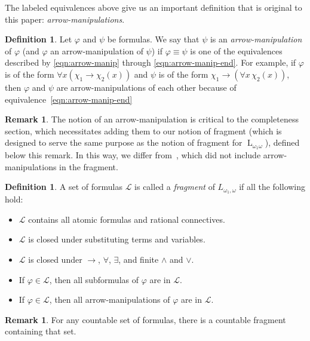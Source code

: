 \documentclass{amsart}
\theoremstyle{definition}
\newtheorem{remark}[theorem]{Remark}
\newtheorem{definition}[theorem]{Definition}
\numberwithin{equation}{theorem}
\renewcommand{\phi}{\varphi}
\newcommand{\narrow}[1]{\xrightarrow{#1}}
\renewcommand{\to}{\narrow{}}
\newcommand{\baselang}{\operatorname{L}}
\newcommand{\lang}{\baselang_{\omega_1\omega}}
\begin{document}
The labeled equivalences above give us an important definition that is original to this paper: \emph{arrow-manipulations}.
\begin{definition}\label{def:arrow-manipulation}
  Let $\phi$ and $\psi$ be formulas.
  We say that $\psi$ is an \emph{arrow-manipulation} of $\phi$ (and $\phi$ an arrow-manipulation of $\psi$) if $\phi\equiv\psi$ is one of the equivalences described by \eqref{eqn:arrow-manip} through \eqref{eqn:arrow-manip-end}.
  For example, if $\phi$ is of the form $\forall x(\chi_1\to\chi_2(x))$ and $\psi$ is of the form $\chi_1\to(\forall x\,\chi_2(x))$, then $\phi$ and $\psi$ are arrow-manipulations of each other because of equivalence~\eqref{eqn:arrow-manip-end}
\end{definition}
\begin{remark}
  The notion of an arrow-manipulation is critical to the completeness section, which necessitates adding them to our notion of fragment (which is designed to serve the same purpose as the notion of fragment for $\lang$), defined below this remark.
  In this way, we differ from~\cite{eagle2014omitting}, which did not include arrow-manipulations in the fragment.
\end{remark}
  \begin{definition}\label{def:fragment}
    A set of formulas $\mathcal L$ is called a \emph{fragment} of $L_{\omega_1,\omega}$ if all the following hold:
    \begin{itemize}
    \item $\mathcal L$ contains all atomic formulas and rational connectives.
    \item $\mathcal L$ is closed under substituting terms and variables.
    \item $\mathcal L$ is closed under $\rightarrow$, $\forall$, $\exists$, and finite $\wedge$ and $\vee$.
    \item If $\phi\in\mathcal L$, then all subformulas of $\phi$ are in $\mathcal L$.
    \item If $\phi\in\mathcal L$, then all arrow-manipulations of $\phi$ are in $\mathcal L$.
    \end{itemize}
  \end{definition}
\begin{remark}
  For any countable set of formulas, there is a countable fragment containing that set.
\end{remark}
\end{document}
